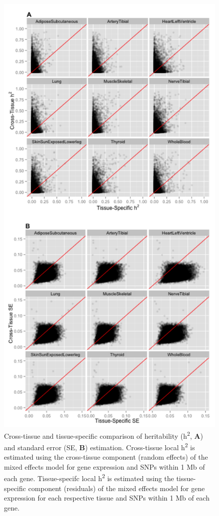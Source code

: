 \documentclass[]{article}
\begin{document}
\begin{figure}[htbp]
\centering
\includegraphics{GenArch_manuscript_files/figure-latex/otdTSh2SE-1.pdf}
\caption{Cross-tissue and tissue-specific comparison of heritability
(h\textsuperscript{2}, \textbf{A}) and standard error (SE, \textbf{B})
estimation. Cross-tissue local h\textsuperscript{2} is estimated using
the cross-tissue component (random effects) of the mixed effects model
for gene expression and SNPs within 1 Mb of each gene. Tissue-specifc
local h\textsuperscript{2} is estimated using the tissue-specific
component (residuals) of the mixed effects model for gene expression for
each respective tissue and SNPs within 1 Mb of each gene.}
\end{figure}
\end{document}
